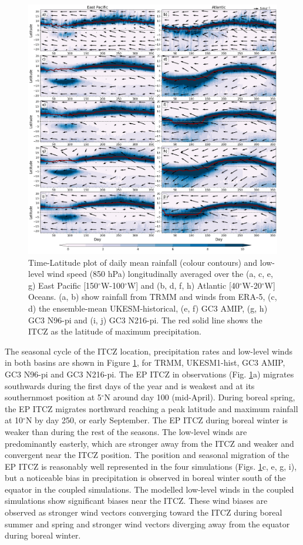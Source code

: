 \begin{figure}[t!]
\centering
 \includegraphics[width=\linewidth]{figures/fig3_p2_v3.png}
\caption[Seasonal evolution of Atlantic and Pacific ITCZ]{ Time-Latitude plot of daily mean rainfall (colour contours) and low-level wind speed (850 hPa) longitudinally averaged over the (a, c, e, g) East Pacific [150$^\circ$W-100$^\circ$W] and (b, d, f, h) Atlantic [40$^\circ$W-20$^\circ$W] Oceans. (a, b) show rainfall from TRMM and winds from ERA-5, (c, d) the ensemble-mean UKESM-historical, (e, f) GC3 AMIP, (g, h) GC3 N96-pi and (i, j) GC3 N216-pi. The red solid line shows the ITCZ as the latitude of maximum precipitation.  }
\label{fig:4}
\end{figure}


The seasonal cycle of the ITCZ location, precipitation rates and low-level winds in both basins are shown in Figure \ref{fig:4}, for TRMM, UKESM1-hist, GC3 AMIP, GC3 N96-pi and GC3 N216-pi.   %
The EP ITCZ in observations (Fig. \ref{fig:4}a) migrates southwards during the first days of the year and is weakest and at its southernmost position at 5$^\circ$N around day 100 (mid-April).  
During boreal spring, the EP ITCZ migrates northward reaching a peak latitude and maximum rainfall at 10$^\circ$N by day 250, or early September. The EP ITCZ during boreal winter is weaker than during the rest of the seasons.
The low-level winds are predominantly easterly, which are stronger away from the ITCZ and weaker and convergent near the ITCZ position.
The position and seasonal migration of the EP ITCZ is reasonably well represented in the four simulations (Figs. \ref{fig:4}c, e, g, i), but a noticeable bias in precipitation is observed in  boreal winter south of the equator in the coupled simulations. The modelled  low-level winds in the coupled simulations show significant biases near the ITCZ.
These wind biases are observed as stronger wind vectors converging toward the ITCZ during boreal summer and spring and stronger wind vectors diverging away from the equator during boreal winter. 


